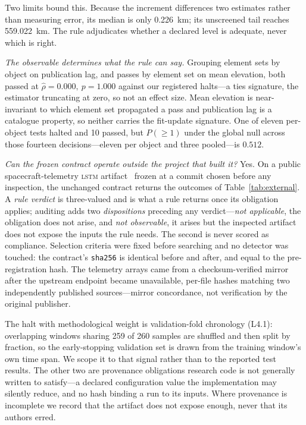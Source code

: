 \documentclass[conference]{IEEEtran}
\newcommand{\rulename}[1]{\textsf{#1}}
\newcommand{\artv}[2]{#2}
\begin{document}
Two limits bound this. Because the increment differences two estimates rather than measuring error,
its median is only \qty{\artv{at_median_km}{0.226}}{\kilo\metre}; its unscreened tail reaches \qty{\artv{at_max_km}{559.022}}{\kilo\metre}. The rule adjudicates whether a declared level is adequate,
never which is right.

\emph{The observable determines what the rule can say.} Grouping element sets by object on
publication lag, and passes by element set on mean elevation, both passed at
$\hat{\rho}=\artv{real_icc_ab}{0.000},\ p=\artv{real_p_ab}{1.000}$ against our registered halts---a ties signature, the estimator
truncating at zero, so not an effect size. Mean elevation is near-invariant to which element set
propagated a pass and publication lag is a catalogue property, so neither carries the fit-update
signature. \artv{real_halt}{One} of eleven per-object tests halted and
\artv{real_pass}{10} passed, but $P(\ge 1)$ under the global null across those
\artv{at_decisions}{fourteen} decisions---eleven per object and three pooled---is
$\artv{at_p_any}{0.512}$.

\emph{Can the frozen contract operate outside the project that built it?} Yes. On a public
spacecraft-telemetry \textsc{lstm} artifact~\cite{hundman2018telemanom} frozen at a commit chosen
before any inspection, the unchanged contract returns the outcomes of
Table~\ref{tab:external}. A \emph{rule verdict} is
three-valued and is what a rule returns once its obligation applies; auditing adds two
\emph{dispositions} preceding any verdict---\emph{not applicable}, the obligation does not arise,
and \emph{not observable}, it arises but the inspected artifact does not expose the inputs the rule
needs. The second is never scored as compliance. Selection criteria were fixed
before searching and no detector was touched: the contract's \texttt{sha256} is identical before
and after, and equal to the pre-registration hash. The telemetry arrays came from a checksum-verified mirror
after the upstream endpoint became unavailable, per-file hashes matching two independently published
sources---mirror concordance, not verification by the original publisher.

The halt with methodological weight is validation-fold chronology
(\rulename{L4.1}): overlapping windows sharing \artv{cons_windows}{\num{259}} of
\artv{cons_span}{\num{260}} samples are shuffled and then split by fraction, so the early-stopping validation set is
drawn from the training window's own time span. We scope it to that signal rather than to the
reported test results. The other two are provenance
obligations research code is not generally written to satisfy---a declared configuration value the
implementation may silently reduce, and no hash binding a run to its inputs. Where provenance is incomplete we record
that the artifact does not expose enough, never that its authors erred.
\end{document}
